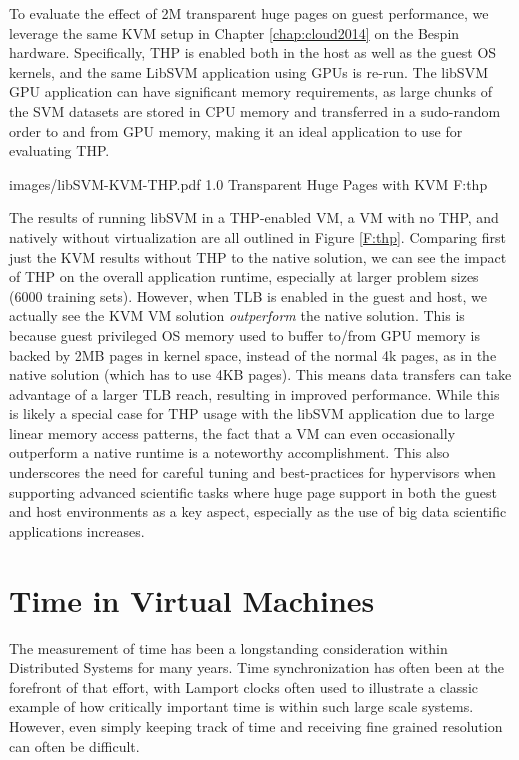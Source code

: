 To evaluate the effect of 2M transparent huge pages on guest performance, we leverage the same KVM setup in Chapter \ref{chap:cloud2014} on the Bespin hardware. Specifically, THP is enabled both in the host as well as the guest OS kernels, and the same LibSVM application using GPUs is re-run. The libSVM GPU application can have significant memory requirements, as large chunks of the SVM datasets are stored in CPU memory and transferred in a sudo-random order to and from GPU memory, making it an ideal application to use for evaluating THP.



  {images/libSVM-KVM-THP.pdf}
  {1.0}
  {Transparent Huge Pages with KVM}
  {F:thp}


The results of running libSVM in a THP-enabled VM, a VM with no THP, and natively without virtualization are all outlined in Figure \ref{F:thp}.  Comparing first just the KVM results without THP to the native solution, we can see the impact of THP on the overall application runtime, especially at larger problem sizes (6000 training sets). However, when TLB is enabled in the guest and host, we actually see the KVM VM solution \emph{outperform} the native solution. This is because guest privileged OS memory used to buffer to/from GPU memory is backed by 2MB pages in kernel space, instead of the normal 4k pages, as in the native solution (which has to use 4KB pages). This means data transfers can take advantage of a larger TLB reach, resulting in improved performance.  While this is likely a special case for THP usage with the libSVM application due to large linear memory access patterns, the fact that a VM can even occasionally outperform a native runtime is a noteworthy accomplishment. This also underscores the need for careful tuning and best-practices for hypervisors when supporting advanced scientific tasks where huge page support in both the guest and host environments as a key aspect, especially as the use of big data scientific applications increases.  

\section{Time in Virtual Machines}

The measurement of time has been a longstanding consideration within Distributed Systems for many years.  Time synchronization has often been at the forefront of that effort, with Lamport clocks \cite{lamport1978time} often used to illustrate a classic example of how critically important time is within such large scale systems.  However, even simply keeping track of time and receiving fine grained resolution can often be difficult.  


